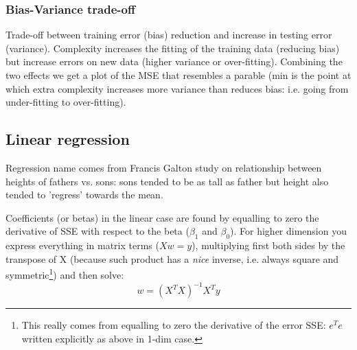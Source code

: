 \documentclass[11pt]{article}
\begin{document}
\subsubsection{Bias-Variance trade-off}
Trade-off between training error (bias) reduction and increase in testing error (variance).
Complexity increases the fitting of the training data (reducing bias) but increase errors on new data (higher variance or over-fitting). Combining the two effects we get a plot of the MSE that resembles a parable (min is the point at which extra complexity increases more variance than reduces bias: i.e. going from under-fitting to over-fitting).

\subsection{Linear regression}
Regression name comes from Francis Galton study on relationship between heights of fathers vs. sons: sons  tended to be as tall as father but height also tended to 'regress' towards the mean.  

Coefficients (or betas) in the linear case are found by equalling to zero the derivative of SSE with respect to the beta ($\beta_1$ and $\beta_0$). For higher dimension you express everything in matrix terms ($X w = y$), multiplying first both sides by the transpose of X (because such product has a \textit{nice} inverse, i.e. always square and symmetric\footnote{This really comes from equalling to zero the derivative of the error SSE: $e^T e$ written explicitly as above in 1-dim case.}) and then solve:
\[ w = (X^T X)^{-1} X^T y
\]
\end{document}
